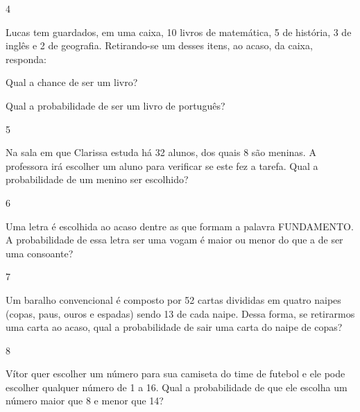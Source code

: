 {\begin{escolha}

\num{4}

Lucas tem guardados, em uma caixa, 10 livros de matemática, 5 de história, 3 de inglês e
2 de geografia. Retirando-se um desses itens, ao acaso, da caixa,
responda:

\begin{escolha}

\item
 Qual a chance de ser um livro?

\item
  Qual a probabilidade de ser um livro de português?

\end{escolha}

\num{5}

Na sala em que Clarissa estuda há 32 alunos, dos quais 8 são meninas. A
professora irá escolher um aluno para verificar se este fez a tarefa.
Qual a probabilidade de um menino ser escolhido?


\num{6}

Uma letra é escolhida ao acaso dentre as que formam a palavra
FUNDAMENTO. A probabilidade de essa letra ser uma vogam é maior ou menor do que a de ser uma consoante?


\num{7}

Um baralho convencional é composto por 52 cartas divididas em quatro
naipes (copas, paus, ouros e espadas) sendo 13 de cada naipe. Dessa
forma, se retirarmos uma carta ao acaso, qual a probabilidade de sair
uma carta do naipe de copas?


\num{8}

Vítor quer escolher um número para sua camiseta do time de futebol e ele
pode escolher qualquer número de 1 a 16. Qual a probabilidade de que ele
escolha um número maior que 8 e menor que 14?


\end{escolha}}
